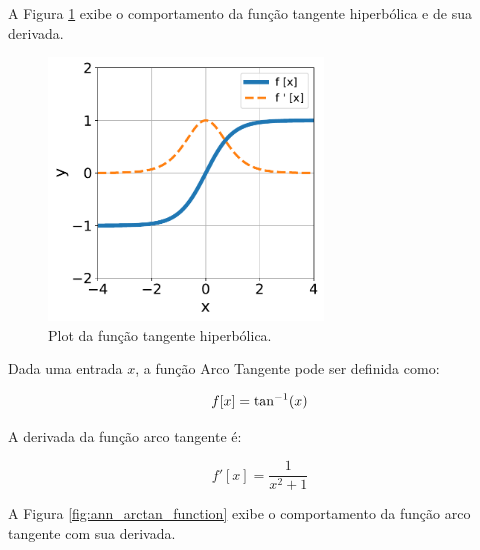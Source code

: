 A Figura \ref{fig:ann_tanh_function} exibe o comportamento da função tangente hiperbólica e de sua derivada.

\begin{figure}[H]
    \centering
    \includegraphics[width=0.65\textwidth]{figs/ann_tanh_function.pdf}

    \caption{Plot da função tangente hiperbólica.}
    \label{fig:ann_tanh_function}
\end{figure}


\linebreak
\newpage


\begin{definition}
    Dada uma entrada $x$, a função Arco Tangente pode ser definida como:

    \begin{equation}
        f[x] = \text{tan}^{-1}(x)
        \vspace{0.2cm}
        \label{eq:ann_arctan_function}
    \end{equation}

    A derivada da função arco tangente é:

    \begin{equation}
        f'[x] = \dfrac{1}{x^{2} + 1}
        \label{eq:ann_arctan_function_dy}
    \end{equation}

\end{definition}

A Figura \ref{fig:ann_arctan_function} exibe o comportamento da função arco tangente com sua derivada.


